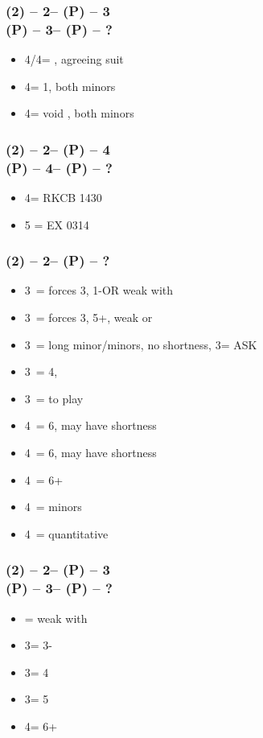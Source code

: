 \documentclass[12pt, a4paper]{article}
\begin{document}
\subsubsection*{(2\hearts) -- 2\nt -- (P) -- 3\spades \\
                (P) -- 3\nt -- (P) -- ?}
\begin{itemize}
    \item 4\clubs/4\diams = \nat, agreeing suit
    \item 4\hearts = 1\spades, both minors
    \item 4\spades = void \spades, both minors
\end{itemize}

\subsubsection*{(2\hearts) -- 2\nt -- (P) -- 4\hearts \\
                (P) -- 4\spades -- (P) -- ?}
\begin{itemize}
    \item 4\nt = RKCB 1430
    \item 5 = EX 0314
\end{itemize}

\subsubsection*{(2\spades) -- 2\nt -- (P) -- ?}
\begin{itemize}
    \item 3\clubs\ = forces 3\diams, 1-\spades \gf OR weak with \diams
    \item 3\diams\ = forces 3\hearts, 5+\hearts, weak or \gf
    \item 3\hearts\ = long minor/minors, no \spades shortness, 3\spades = ASK
    \item 3\spades\ = 4\hearts, \gf
    \item 3\nt\ = to play
    \item 4\clubs\ = 6\hearts, may have shortness
    \item 4\diams\ = 6\hearts, may have shortness
    \item 4\hearts\ = 6+\hearts
    \item 4\spades\ = minors
    \item 4\nt\ = quantitative
\end{itemize}

\subsubsection*{(2\spades) -- 2\nt -- (P) -- 3\clubs \\
                (P) -- 3\diams -- (P) -- ?}
\begin{itemize}
    \item \pass = weak with \diams
    \item 3\hearts = 3-\hearts
    \item 3\spades = 4\hearts
    \item 3\nt = 5\hearts
    \item 4\clubs = 6+\hearts
\end{itemize}
\end{document}
